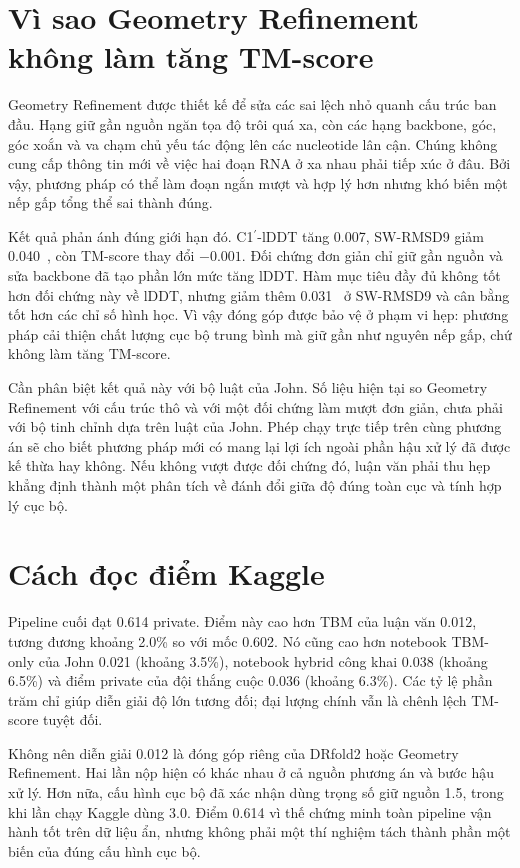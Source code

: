 \documentclass[12pt,a4paper,oneside]{report}
\newcommand{\cprime}{C1$^{\prime}$}
\newcommand{\angstrom}{\text{\AA}}
\begin{document}
\section{Vì sao Geometry Refinement không làm tăng TM-score}

Geometry Refinement được thiết kế để sửa các sai lệch nhỏ quanh cấu trúc ban đầu. Hạng
giữ gần nguồn ngăn tọa độ trôi quá xa, còn các hạng backbone, góc, góc xoắn và va chạm
chủ yếu tác động lên các nucleotide lân cận. Chúng không cung cấp thông tin mới về việc
hai đoạn RNA ở xa nhau phải tiếp xúc ở đâu. Bởi vậy, phương pháp có thể làm đoạn ngắn
mượt và hợp lý hơn nhưng khó biến một nếp gấp tổng thể sai thành đúng.

Kết quả phản ánh đúng giới hạn đó. \cprime{}-lDDT tăng 0.007, SW-RMSD9 giảm
0.040~\angstrom{}, còn TM-score thay đổi $-0.001$. Đối chứng đơn giản chỉ giữ gần nguồn
và sửa backbone đã tạo phần lớn mức tăng lDDT. Hàm mục tiêu đầy đủ không tốt hơn đối chứng
này về lDDT, nhưng giảm thêm 0.031~\angstrom{} ở SW-RMSD9 và cân bằng tốt hơn các chỉ số
hình học. Vì vậy đóng góp được bảo vệ ở phạm vi hẹp: phương pháp cải thiện chất lượng cục
bộ trung bình mà giữ gần như nguyên nếp gấp, chứ không làm tăng TM-score.

Cần phân biệt kết quả này với bộ luật của John. Số liệu hiện tại so Geometry Refinement
với cấu trúc thô và với một đối chứng làm mượt đơn giản, chưa phải với bộ tinh chỉnh dựa trên luật
của John. Phép chạy trực tiếp trên cùng phương án sẽ cho biết phương pháp mới có mang lại
lợi ích ngoài phần hậu xử lý đã được kế thừa hay không. Nếu không vượt được đối chứng đó,
luận văn phải thu hẹp khẳng định thành một phân tích về đánh đổi giữa độ đúng toàn cục và tính
hợp lý cục bộ.

\section{Cách đọc điểm Kaggle}

Pipeline cuối đạt 0.614 private. Điểm này cao hơn TBM của luận văn 0.012, tương đương
khoảng 2.0\% so với mốc 0.602. Nó cũng cao hơn notebook TBM-only của John 0.021
(khoảng 3.5\%), notebook hybrid công khai 0.038 (khoảng 6.5\%) và điểm private của đội
thắng cuộc 0.036 (khoảng 6.3\%). Các tỷ lệ phần trăm chỉ giúp diễn giải độ lớn tương đối;
đại lượng chính vẫn là chênh lệch TM-score tuyệt đối.

Không nên diễn giải 0.012 là đóng góp riêng của DRfold2 hoặc Geometry Refinement. Hai lần
nộp hiện có khác nhau ở cả nguồn phương án và bước hậu xử lý. Hơn nữa, cấu hình cục bộ đã
xác nhận dùng trọng số giữ nguồn 1.5, trong khi lần chạy Kaggle dùng 3.0. Điểm 0.614 vì
thế chứng minh toàn pipeline vận hành tốt trên dữ liệu ẩn, nhưng không phải một thí nghiệm tách thành phần
một biến của đúng cấu hình cục bộ.
\end{document}
